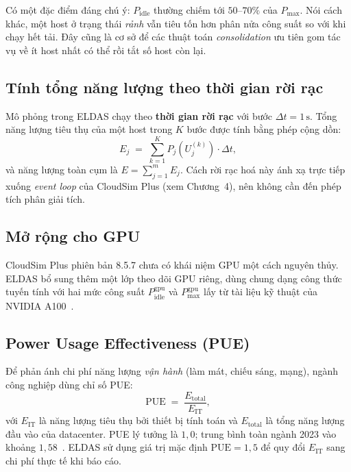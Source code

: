 Có một đặc điểm đáng chú ý: $P_{\mathrm{idle}}$ thường chiếm tới
$50$--$70\%$ của $P_{\mathrm{max}}$. Nói cách khác, một host ở trạng thái
\textit{rảnh} vẫn tiêu tốn hơn phân nửa công suất so với khi chạy hết tải.
Đây cũng là cơ sở để các thuật toán \textit{consolidation} ưu tiên gom tác
vụ về ít host nhất có thể rồi tắt số host còn lại.

\subsection{Tính tổng năng lượng theo thời gian rời rạc}
Mô phỏng trong ELDAS chạy theo \textbf{thời gian rời rạc} với bước
$\Delta t = 1\,\mathrm{s}$. Tổng năng lượng tiêu thụ của một host trong
$K$ bước được tính bằng phép cộng dồn:
\begin{equation}
  E_j \;=\; \sum_{k=1}^{K} P_j\!\left(U_j^{(k)}\right) \cdot \Delta t,
  \label{eq:energy-discrete}
\end{equation}
và năng lượng toàn cụm là $E = \sum_{j=1}^{m} E_j$. Cách rời rạc hoá này
ánh xạ trực tiếp xuống \textit{event loop} của CloudSim Plus
(xem Chương~4), nên không cần đến phép tích phân giải tích.

\subsection{Mở rộng cho GPU}
CloudSim Plus phiên bản 8.5.7 chưa có khái niệm GPU một cách nguyên thủy.
ELDAS bổ sung thêm một lớp theo dõi GPU riêng, dùng chung dạng công thức
tuyến tính với hai mức công suất $P^{\mathrm{gpu}}_{\mathrm{idle}}$ và
$P^{\mathrm{gpu}}_{\mathrm{max}}$ lấy từ tài liệu kỹ thuật của NVIDIA
A100~\cite{nvidia2023a100}.

\subsection{Power Usage Effectiveness (PUE)}
Để phản ánh chi phí năng lượng \textit{vận hành} (làm mát, chiếu sáng, mạng),
ngành công nghiệp dùng chỉ số PUE:
\begin{equation}
  \mathrm{PUE} \;=\; \frac{E_{\mathrm{total}}}{E_{\mathrm{IT}}},
  \label{eq:pue}
\end{equation}
với $E_{\mathrm{IT}}$ là năng lượng tiêu thụ bởi thiết bị tính toán và
$E_{\mathrm{total}}$ là tổng năng lượng đầu vào của datacenter. PUE lý tưởng
là $1{,}0$; trung bình toàn ngành 2023 vào khoảng $1{,}58$~\cite{uptime2023pue}.
ELDAS sử dụng giá trị mặc định $\mathrm{PUE} = 1{,}5$ để quy đổi $E_{\mathrm{IT}}$
sang chi phí thực tế khi báo cáo.

